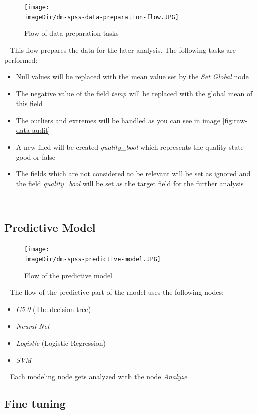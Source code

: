 \documentclass[11pt, a4paper, twoside]{article}   	%
\newcommand{\imageDir}{./images/}
\begin{document}
\begin{figure}[h]
\centering
\texttt{[image: \\imageDir/dm-spss-data-preparation-flow.JPG]}
\caption{Flow of data preparation tasks}
\end{figure}
\ \newline
This flow prepares the data for the later analysis. The following tasks are performed:
\begin{itemize}
	\item Null values will be replaced with the mean value set by the \emph{Set Global} node
	\item The negative value of the field \emph{temp} will be replaced with the global mean of this field
	\item The outliers and extremes will be handled as you can see in image \ref{fig:raw-data-audit}
	\item A new filed will be created \emph{quality\_bool} which represents the quality state good or false
	\item The fields which are not considered to be relevant will be set as ignored and the field \emph{quality\_bool} will be set as the target field for the further analysis
\end{itemize}
\ \newpage

\subsection{Predictive Model}
\begin{figure}[h]
\centering
\texttt{[image: \\imageDir/dm-spss-predictive-model.JPG]}
\caption{Flow of the predictive model}
\end{figure}
\ \newline
The flow of the predictive part of the model uses the following nodes:
\begin{itemize}
	\item \emph{C5.0} (The decision tree)
	\item \emph{Neural Net}
    \item \emph{Logistic} (Logistic Regression)
    \item \emph{SVM}
\end{itemize}
\ \newline
Each modeling node gets analyzed with the node \emph{Analyze}.
\newpage

\subsection{Fine tuning}
\end{document}
